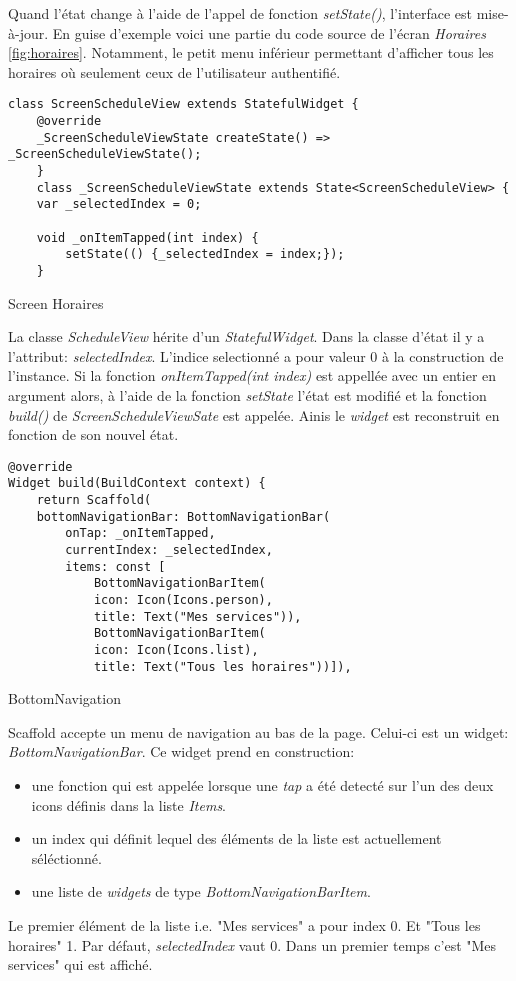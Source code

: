 Quand l'état change à l'aide de l'appel de fonction \textit{setState()}, l'interface est mise-à-jour. En guise d'exemple voici une partie du code source
de l'écran \textit{Horaires} \ref{fig:horaires}. Notamment, le petit menu inférieur permettant d'afficher tous les horaires où seulement ceux de l'utilisateur authentifié.
\begin{listing}[h]
    \begin{verbatim}
class ScreenScheduleView extends StatefulWidget {
    @override
    _ScreenScheduleViewState createState() => _ScreenScheduleViewState();
    }
    class _ScreenScheduleViewState extends State<ScreenScheduleView> {
    var _selectedIndex = 0;
    
    void _onItemTapped(int index) {
        setState(() {_selectedIndex = index;});
    }
        \end{verbatim}
    \caption{Screen Horaires}
    \label{code:screenHoraires}
\end{listing}

La classe \textit{ScheduleView} hérite d'un \textit{StatefulWidget}. Dans la classe d'état il y a l'attribut: \textit{selectedIndex}. L'indice selectionné a pour valeur 0 à la construction de l'instance.
Si la fonction \textit{onItemTapped(int index)} est appellée avec un entier en argument alors, à l'aide de la fonction \textit{setState} l'état est modifié
et la fonction \textit{build()} de \textit{ScreenScheduleViewSate} est appelée. Ainis le \textit{widget} est reconstruit en fonction de son nouvel état.

\begin{listing}[h]
    \begin{verbatim}
@override
Widget build(BuildContext context) {
    return Scaffold(
    bottomNavigationBar: BottomNavigationBar(
        onTap: _onItemTapped,
        currentIndex: _selectedIndex,
        items: const [
            BottomNavigationBarItem(
            icon: Icon(Icons.person),
            title: Text("Mes services")),
            BottomNavigationBarItem(
            icon: Icon(Icons.list),
            title: Text("Tous les horaires"))]),
        \end{verbatim}
    \caption{BottomNavigation}
    \label{code:buildHoraire}
\end{listing}

Scaffold accepte un menu de navigation au bas de la page. Celui-ci est un widget: \textit{BottomNavigationBar}. Ce widget prend en construction:
\begin{itemize}
    \item une fonction qui est appelée lorsque une \textit{tap} a été detecté sur l'un des deux icons définis dans la liste \textit{Items}.
    \item un index qui définit lequel des éléments de la liste est actuellement séléctionné.
    \item une liste de \textit{widgets} de type \textit{BottomNavigationBarItem}.
\end{itemize}
Le premier élément de la liste i.e. "Mes services" a pour index 0. Et "Tous les horaires" 1. Par défaut, \textit{selectedIndex} vaut 0. Dans un premier temps c'est "Mes services" qui est affiché.


